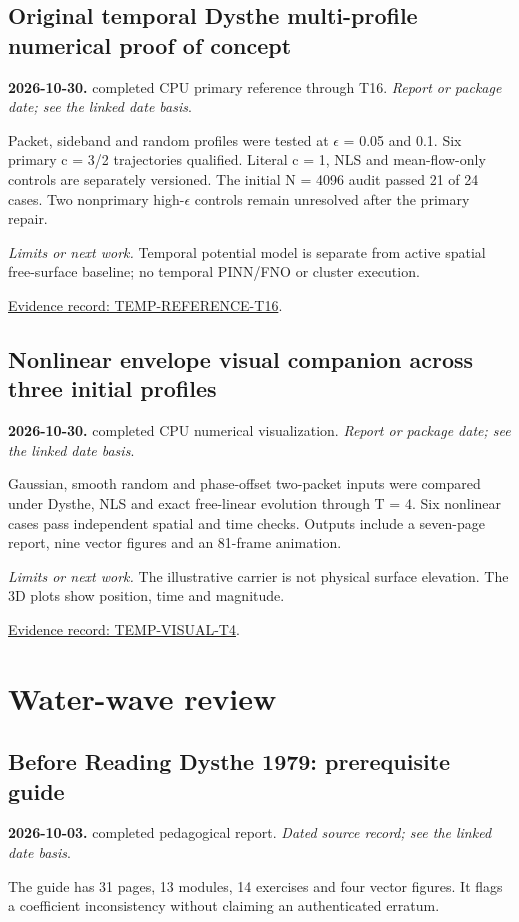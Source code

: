 \documentclass[11pt]{article}
\begin{document}
\subsection*{Original temporal Dysthe multi-profile numerical proof of concept}
\noindent\textbf{2026-10-30.} completed CPU primary reference through T16. \emph{Report or package date; see the linked date basis}.\par
Packet, sideband and random profiles were tested at $\epsilon$ = 0.05 and 0.1. Six primary c = 3/2 trajectories qualified. Literal c = 1, NLS and mean-flow-only controls are separately versioned. The initial N = 4096 audit passed 21 of 24 cases. Two nonprimary high-$\epsilon$ controls remain unresolved after the primary repair.

\noindent\textit{Limits or next work.} Temporal potential model is separate from active spatial free-surface baseline; no temporal PINN/FNO or cluster execution.

\noindent\href{https://github.com/matasvai/dysthe-paper/blob/codex/research-record-2026-11-05/research-record/2026-11-05/README.md#temp-reference-t16}{Evidence record: TEMP-REFERENCE-T16}.
\subsection*{Nonlinear envelope visual companion across three initial profiles}
\noindent\textbf{2026-10-30.} completed CPU numerical visualization. \emph{Report or package date; see the linked date basis}.\par
Gaussian, smooth random and phase-offset two-packet inputs were compared under Dysthe, NLS and exact free-linear evolution through T = 4. Six nonlinear cases pass independent spatial and time checks. Outputs include a seven-page report, nine vector figures and an 81-frame animation.

\noindent\textit{Limits or next work.} The illustrative carrier is not physical surface elevation. The 3D plots show position, time and magnitude.

\noindent\href{https://github.com/matasvai/dysthe-paper/blob/codex/research-record-2026-11-05/research-record/2026-11-05/README.md#temp-visual-t4}{Evidence record: TEMP-VISUAL-T4}.

\section{Water-wave review}
\subsection*{Before Reading Dysthe 1979: prerequisite guide}
\noindent\textbf{2026-10-03.} completed pedagogical report. \emph{Dated source record; see the linked date basis}.\par
The guide has 31 pages, 13 modules, 14 exercises and four vector figures. It flags a coefficient inconsistency without claiming an authenticated erratum.
\end{document}
